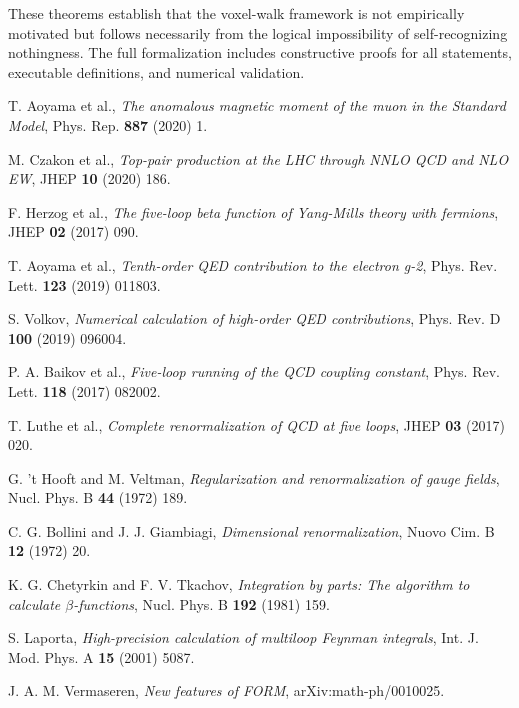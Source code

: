 \documentclass[11pt,a4paper]{article}
\theoremstyle{definition}
\theoremstyle{remark}
\begin{document}
These theorems establish that the voxel-walk framework is not empirically motivated but follows necessarily from the logical impossibility of self-recognizing nothingness. The full formalization includes constructive proofs for all statements, executable definitions, and numerical validation.

\begin{thebibliography}{99}

 T. Aoyama et al., \emph{The anomalous magnetic moment of the muon in the Standard Model}, Phys. Rep. \textbf{887} (2020) 1.

 M. Czakon et al., \emph{Top-pair production at the LHC through NNLO QCD and NLO EW}, JHEP \textbf{10} (2020) 186.

 F. Herzog et al., \emph{The five-loop beta function of Yang-Mills theory with fermions}, JHEP \textbf{02} (2017) 090.

 T. Aoyama et al., \emph{Tenth-order QED contribution to the electron g-2}, Phys. Rev. Lett. \textbf{123} (2019) 011803.

 S. Volkov, \emph{Numerical calculation of high-order QED contributions}, Phys. Rev. D \textbf{100} (2019) 096004.

 P. A. Baikov et al., \emph{Five-loop running of the QCD coupling constant}, Phys. Rev. Lett. \textbf{118} (2017) 082002.

 T. Luthe et al., \emph{Complete renormalization of QCD at five loops}, JHEP \textbf{03} (2017) 020.

 G. 't Hooft and M. Veltman, \emph{Regularization and renormalization of gauge fields}, Nucl. Phys. B \textbf{44} (1972) 189.

 C. G. Bollini and J. J. Giambiagi, \emph{Dimensional renormalization}, Nuovo Cim. B \textbf{12} (1972) 20.

 K. G. Chetyrkin and F. V. Tkachov, \emph{Integration by parts: The algorithm to calculate $\beta$-functions}, Nucl. Phys. B \textbf{192} (1981) 159.

 S. Laporta, \emph{High-precision calculation of multiloop Feynman integrals}, Int. J. Mod. Phys. A \textbf{15} (2001) 5087.

 J. A. M. Vermaseren, \emph{New features of FORM}, arXiv:math-ph/0010025.


\end{thebibliography}
\end{document}

